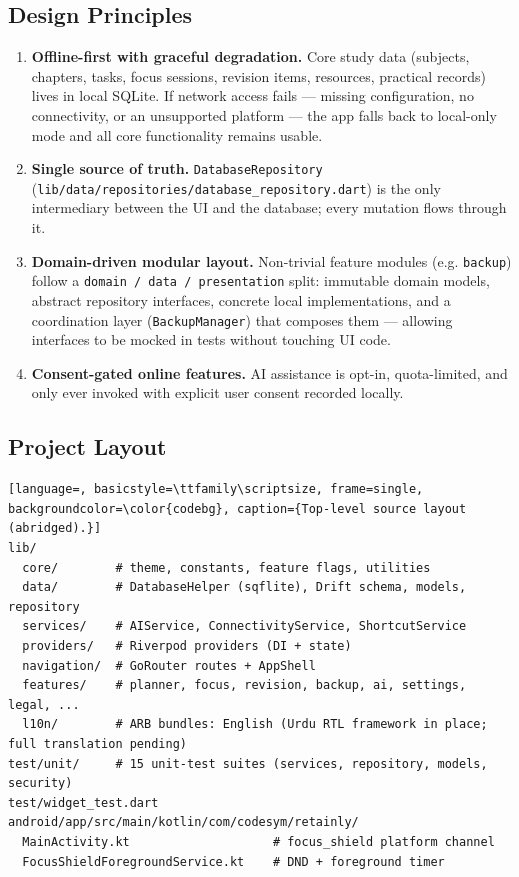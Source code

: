 \documentclass[11pt,a4paper]{article}
\begin{document}
\subsection{Design Principles}
\begin{enumerate}[nosep]
    \item \textbf{Offline-first with graceful degradation.} Core study data (subjects, chapters, tasks, focus sessions, revision items, resources, practical records) lives in local SQLite. If network access fails --- missing configuration, no connectivity, or an unsupported platform --- the app falls back to local-only mode and all core functionality remains usable.
    \item \textbf{Single source of truth.} \texttt{DatabaseRepository} (\texttt{lib/data/repositories/database\_repository.dart}) is the only intermediary between the UI and the database; every mutation flows through it.
    \item \textbf{Domain-driven modular layout.} Non-trivial feature modules (e.g. \texttt{backup}) follow a \texttt{domain / data / presentation} split: immutable domain models, abstract repository interfaces, concrete local implementations, and a coordination layer (\texttt{BackupManager}) that composes them --- allowing interfaces to be mocked in tests without touching UI code.
    \item \textbf{Consent-gated online features.} AI assistance is opt-in, quota-limited, and only ever invoked with explicit user consent recorded locally.
\end{enumerate}

\subsection{Project Layout}
\begin{lstlisting}[language=, basicstyle=\ttfamily\scriptsize, frame=single, backgroundcolor=\color{codebg}, caption={Top-level source layout (abridged).}]
lib/
  core/        # theme, constants, feature flags, utilities
  data/        # DatabaseHelper (sqflite), Drift schema, models, repository
  services/    # AIService, ConnectivityService, ShortcutService
  providers/   # Riverpod providers (DI + state)
  navigation/  # GoRouter routes + AppShell
  features/    # planner, focus, revision, backup, ai, settings, legal, ...
  l10n/        # ARB bundles: English (Urdu RTL framework in place; full translation pending)
test/unit/     # 15 unit-test suites (services, repository, models, security)
test/widget_test.dart
android/app/src/main/kotlin/com/codesym/retainly/
  MainActivity.kt                    # focus_shield platform channel
  FocusShieldForegroundService.kt    # DND + foreground timer
\end{lstlisting}
\end{document}
